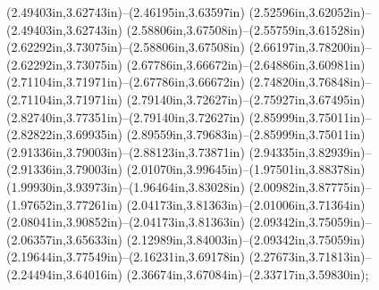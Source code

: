 (2.49403in,3.62743in)--(2.46195in,3.63597in) (2.52596in,3.62052in)--(2.49403in,3.62743in) (2.58806in,3.67508in)--(2.55759in,3.61528in) (2.62292in,3.73075in)--(2.58806in,3.67508in) (2.66197in,3.78200in)--(2.62292in,3.73075in) (2.67786in,3.66672in)--(2.64886in,3.60981in) (2.71104in,3.71971in)--(2.67786in,3.66672in) (2.74820in,3.76848in)--(2.71104in,3.71971in) (2.79140in,3.72627in)--(2.75927in,3.67495in) (2.82740in,3.77351in)--(2.79140in,3.72627in) (2.85999in,3.75011in)--(2.82822in,3.69935in) (2.89559in,3.79683in)--(2.85999in,3.75011in) (2.91336in,3.79003in)--(2.88123in,3.73871in) (2.94335in,3.82939in)--(2.91336in,3.79003in) (2.01070in,3.99645in)--(1.97501in,3.88378in) (1.99930in,3.93973in)--(1.96464in,3.83028in) (2.00982in,3.87775in)--(1.97652in,3.77261in) (2.04173in,3.81363in)--(2.01006in,3.71364in) (2.08041in,3.90852in)--(2.04173in,3.81363in) (2.09342in,3.75059in)--(2.06357in,3.65633in) (2.12989in,3.84003in)--(2.09342in,3.75059in) (2.19644in,3.77549in)--(2.16231in,3.69178in) (2.27673in,3.71813in)--(2.24494in,3.64016in) (2.36674in,3.67084in)--(2.33717in,3.59830in);
